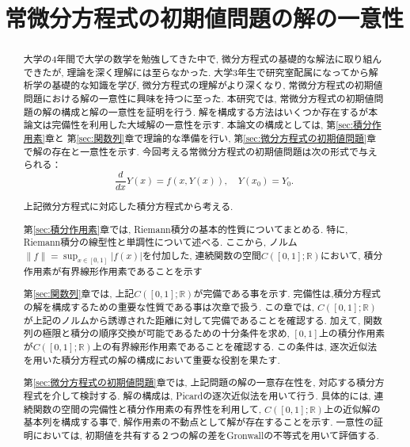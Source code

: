 \documentclass[12pt,xelatex,ja=standard]{bxjsarticle}
\begin{document}

\title{常微分方程式の初期値問題の解の一意性}
\begin{abstract}
\label{sec:intro}
大学の4年間で大学の数学を勉強してきた中で,
微分方程式の基礎的な解法に取り組んできたが,
理論を深く理解には至らなかった.
大学3年生で研究室配属になってから解析学の基礎的な知識を学び,
微分方程式の理解がより深くなり,
常微分方程式の初期値問題における解の一意性に興味を持つに至った.
本研究では, 常微分方程式の初期値問題の解の構成と解の一意性を証明を行う.
解を構成する方法はいくつか存在するが本論文は完備性を利用した大域解の一意性を示す.
本論文の構成としては,
第\ref{sec:積分作用素}章と
第\ref{sec:関数列}章で理論的な準備を行い,
第\ref{sec:微分方程式の初期値問題}章で解の存在と一意性を示す.
今回考える常微分方程式の初期値問題は次の形式で与えられる：
	\[
	\frac{d}{dx}Y(x) = f(x, Y(x)),
	\quad Y(x_{0}) = Y_{0}.
	\]

上記微分方程式に対応した積分方程式から考える.

第\ref{sec:積分作用素}章では,
Riemann積分の基本的性質についてまとめる.
特に, Riemann積分の線型性と単調性について述べる.
ここから,
ノルム$\|f\| = \sup_{x \in [0,1]} |f(x)|$を付加した,
連続関数の空間$C([0,1];\mathbb{R})$において,
積分作用素が有界線形作用素であることを示す

第\ref{sec:関数列}章では,
上記$C([0,1];\mathbb{R})$が完備である事を示す.
完備性は,積分方程式の解を構成するための重要な性質である事は次章で扱う.
この章では,
$C([0,1];\mathbb{R})$が上記のノルムから誘導された距離に対して完備であることを確認する.
加えて,
関数列の極限と積分の順序交換が可能であるための十分条件を求め,
$[0,1]$上の積分作用素が$C([0,1];\mathbb{R})$上の有界線形作用素であることを確認する.
この条件は, 逐次近似法を用いた積分方程式の解の構成において重要な役割を果たす.

第\ref{sec:微分方程式の初期値問題}章では,
上記問題の解の一意存在性を,
対応する積分方程式を介して検討する.
解の構成は,
Picardの逐次近似法を用いて行う.
具体的には,
連続関数の空間の完備性と積分作用素の有界性を利用して,
$C([0,1];\mathbb{R})$上の近似解の基本列を構成する事で,
解作用素の不動点として解が存在することを示す.
一意性の証明においては,
初期値を共有する２つの解の差をGronwallの不等式を用いて評価する.
\end{abstract}
\maketitle
\Mokuji
\end{document}
